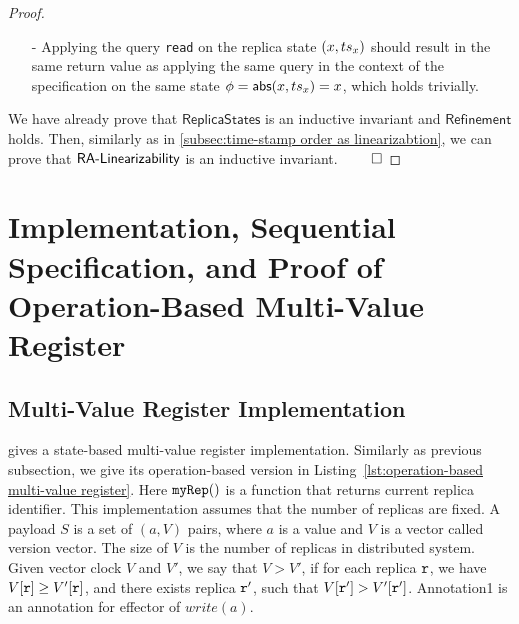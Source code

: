 \begin {proof}
\begin{itemize}
\item[-] Applying the query {\tt read} on the replica state $(x,\ats_x)$ should result in the same return value as applying the same query in the context of the specification on the same state $\abstate = \refmap(x,\ats_x) = x$, which holds trivially.
\end{itemize}


We have already prove that $\mathsf{ReplicaStates}$ is an inductive invariant and $\mathsf{Refinement}$ holds. Then, similarly as in \sectionautorefname \ref{subsec:time-stamp order as linearizabtion}, we can prove that $\mathsf{\CRDTLinshort{}}$ is an inductive invariant. $\qed$
\end {proof}






\section{Implementation, Sequential Specification, and Proof of Operation-Based Multi-Value Register}
\label{sec:implementation, sequential specification, and proof of opeation-based multi-value register}


\subsection{Multi-Value Register Implementation}
\label{subsec:multi-value register implementation}


\cite{ShapiroPBZ11} gives a state-based multi-value register implementation. Similarly as previous subsection, we give its operation-based version in Listing~\ref{lst:operation-based multi-value register}. Here $\alabelshort[{\tt myRep}]{}$ is a function that returns current replica identifier. This implementation assumes that the number of replicas are fixed. A payload $S$ is a set of $(a,V)$ pairs, where $a$ is a value and $V$ is a vector called version vector. The size of $V$ is the number of replicas in distributed system. %
Given vector clock $V$ and $V'$, we say that $V > V'$, if for each replica $\arep$, we have $V[\arep] \geq V'[\arep]$, and there exists replica $\arep'$, such that $V[\arep'] > V'[\arep']$. Annotation1 is an annotation for effector of $write(a)$.


